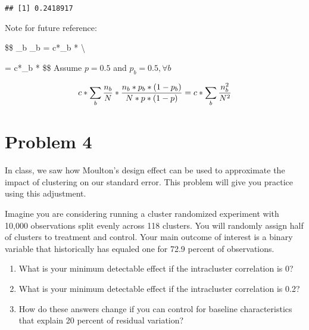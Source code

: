 \documentclass[
]{article}
\newenvironment{Shaded}{\begin{snugshade}}{\end{snugshade}}
\newcommand{\CommentTok}[1]{\textcolor[rgb]{0.56,0.35,0.01}{\textit{#1}}}
\newcommand{\FunctionTok}[1]{\textcolor[rgb]{0.00,0.00,0.00}{#1}}
\newcommand{\NormalTok}[1]{#1}
\newcommand{\SpecialCharTok}[1]{\textcolor[rgb]{0.00,0.00,0.00}{#1}}
\begin{document}
\begin{Shaded}
\end{Shaded}

\begin{verbatim}
## [1] 0.2418917
\end{verbatim}

Note for future reference:

\$\$ \sum\_b
\emph{}\hat{\Delta}\_b =
c*\sum\_b * \textbackslash{}

= c*\sum\_b * \$\$
Assume \(p = 0.5\) and \(p_b = 0.5, \forall b\)

\[
c*\sum_b \dfrac{n_b}{N}*\dfrac{n_b*p_b*(1-p_b)}{N*p*(1-p)} = c*\sum_b \dfrac{n_b^2}{N^2} \\
\]

\newpage

\hypertarget{problem-4}{%
\section{Problem 4}\label{problem-4}}

In class, we saw how Moulton's design effect can be used to approximate
the impact of clustering on our standard error. This problem will give
you practice using this adjustment.

Imagine you are considering running a cluster randomized experiment with
10,000 observations split evenly across 118 clusters. You will randomly
assign half of clusters to treatment and control. Your main outcome of
interest is a binary variable that historically has equaled one for 72.9
percent of observations.

\begin{enumerate}
\def\labelenumi{\arabic{enumi}.}
\item
  What is your minimum detectable effect if the intracluster correlation
  is 0?
\item
  What is your minimum detectable effect if the intracluster correlation
  is 0.2?
\item
  How do these answers change if you can control for baseline
  characteristics that explain 20 percent of residual variation?
\end{enumerate}
\end{document}
